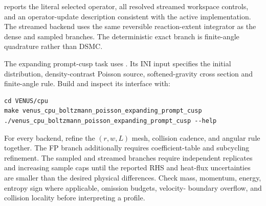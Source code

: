  reports the literal selected operator, all resolved
streamed workspace controls, and an operator-update description consistent
with the active implementation.  The streamed backend uses the same
reversible reaction-extent integrator as the dense and sampled branches.  The
deterministic exact branch is finite-angle quadrature rather than DSMC.

The expanding prompt-cusp task uses
.
Its INI input specifies the initial distribution, density-contrast Poisson
source, softened-gravity cross section and finite-angle rule. Build and
inspect its interface with:
\begin{lstlisting}
cd VENUS/cpu
make venus_cpu_boltzmann_poisson_expanding_prompt_cusp
./venus_cpu_boltzmann_poisson_expanding_prompt_cusp --help
\end{lstlisting}

For every backend, refine the \((r,w,L)\) mesh, collision cadence, and angular
rule together.  The FP branch additionally requires coefficient-table and
subcycling refinement.  The sampled and streamed branches require independent
replicates and increasing sample caps until the reported RHS and heat-flux
uncertainties are smaller than the desired physical differences.  Check mass,
momentum, energy, entropy sign where applicable, omission budgets, velocity-
boundary overflow, and collision locality before interpreting a profile.
